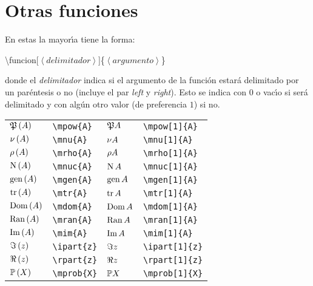 \documentclass[10pt, a4paper]{article}
\newcommand{\inprod}[1]{\left\langle #1 \right\rangle}
\newcommand{\mpow}[2][0]{
	\ifthenelse{ \equal{#1}{0} }{\mathfrak{P}\left( #2 \right)}{\mathfrak{P}{#2}}
}
\newcommand{\mnu}[2][0]{
	\ifthenelse{ \equal{#1}{0} }{\nu\left( #2 \right)}{\nu{#2}}
}
\newcommand{\mrho}[2][0]{
	\ifthenelse{ \equal{#1}{0} }{\rho\left( #2 \right)}{\rho{#2}}
}
\newcommand{\mnuc}[2][0]{
	\ifthenelse{ \equal{#1}{0} }{\operatorname{N}\left( #2 \right)}{\operatorname{N}{#2}}
}
\newcommand{\mgen}[2][0]{
	\ifthenelse{ \equal{#1}{0} }{\operatorname{gen}\left( #2 \right)}{\operatorname{gen}{#2}}
}
\newcommand{\mtr}[2][0]{
	\ifthenelse{ \equal{#1}{0} }{\operatorname{tr}\left( #2 \right)}{\operatorname{tr}{#2}}
}
\newcommand{\mdom}[2][0]{
	\ifthenelse{ \equal{#1}{0} }{\operatorname{Dom}\left( #2 \right)}{\operatorname{Dom}{#2}}
}
\newcommand{\mran}[2][0]{
	\ifthenelse{ \equal{#1}{0} }{\operatorname{Ran}\left( #2 \right)}{\operatorname{Ran}{#2}}
}
\newcommand{\mim}[2][0]{
	\ifthenelse{ \equal{#1}{0} }{\operatorname{Im}\left( #2 \right)}{\operatorname{Im}{#2}}
}
\newcommand{\ipart}[2][0]{
	\ifthenelse{ \equal{#1}{0} }{\Im\left( #2 \right)}{\Im{#2}}
}
\newcommand{\rpart}[2][0]{
	\ifthenelse{ \equal{#1}{0} }{\Re\left( #2 \right)}{\Re{#2}}
}
\newcommand{\mprob}[2][0]{
	\ifthenelse{ \equal{#1}{0} }{\mathbb{P}\left( #2 \right)}{\mathbb{P}{#2}}
}
\begin{document}
\section{Otras funciones}
En estas la mayor\'{\i}a tiene la forma:
\begin{center}
	\ttfamily
	\textbackslash funcion[$ \inprod{delimitador} $]\{$ \inprod{argumento} $\}
\end{center}
donde el \emph{delimitador} indica si el argumento de la función estará delimitado por un paréntesis o no (incluye el par \emph{left} y \emph{right}). Esto se indica con $ 0 $ o vac\'{\i}o si será delimitado y con algún otro valor (de preferencia $ 1 $) si no.
\begin{center}
	\begin{tabular}{ll|ll}
		$ \mpow{A} $ & \texttt{\textbackslash mpow\{A\}} & $ \mpow[1]{A} $ & \texttt{\textbackslash mpow[1]\{A\}}\\
		$ \mnu{A} $ & \texttt{\textbackslash mnu\{A\}} & $ \mnu[1]{A} $ & \texttt{\textbackslash mnu[1]\{A\}}\\
		$ \mrho{A} $ & \texttt{\textbackslash mrho\{A\}} & $ \mrho[1]{A} $ & \texttt{\textbackslash mrho[1]\{A\}}\\
		$ \mnuc{A} $ & \texttt{\textbackslash mnuc\{A\}} & $ \mnuc[1]{A} $ & \texttt{\textbackslash mnuc[1]\{A\}}\\
		$ \mgen{A} $ & \texttt{\textbackslash mgen\{A\}} & $ \mgen[1]{A} $ & \texttt{\textbackslash mgen[1]\{A\}}\\
		$ \mtr{A} $ & \texttt{\textbackslash mtr\{A\}} & $ \mtr[1]{A} $ & \texttt{\textbackslash mtr[1]\{A\}}\\
		$ \mdom{A} $ & \texttt{\textbackslash mdom\{A\}} & $ \mdom[1]{A} $ & \texttt{\textbackslash mdom[1]\{A\}}\\
		$ \mran{A} $ & \texttt{\textbackslash mran\{A\}} & $ \mran[1]{A} $ & \texttt{\textbackslash mran[1]\{A\}}\\
		$ \mim{A} $ & \texttt{\textbackslash mim\{A\}} & $ \mim[1]{A} $ & \texttt{\textbackslash mim[1]\{A\}}\\
		$ \ipart{z} $ & \texttt{\textbackslash ipart\{z\}} & $ \ipart[1]{z} $ & \texttt{\textbackslash ipart[1]\{z\}}\\
		$ \rpart{z} $ & \texttt{\textbackslash rpart\{z\}} & $ \rpart[1]{z} $ & \texttt{\textbackslash rpart[1]\{z\}}\\
		$ \mprob{X} $ & \texttt{\textbackslash mprob\{X\}} & $ \mprob[1]{X} $ & \texttt{\textbackslash mprob[1]\{X\}}\\

\end{tabular}
\end{center}
\end{document}
